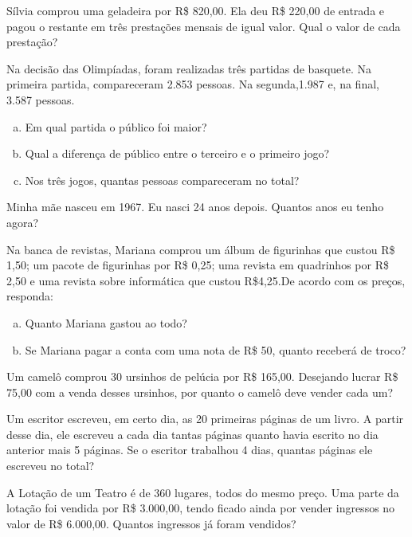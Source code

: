 	\item  Sílvia comprou uma geladeira por R\$ 820,00. Ela deu R\$ 220,00 de entrada e pagou o restante em três prestações mensais de igual valor. Qual o valor de cada prestação?

	\item Na decisão das Olimpíadas, foram realizadas três partidas de basquete. Na primeira partida, compareceram 2.853 pessoas. Na segunda,1.987 e, na final, 3.587 pessoas.
	\begin{enumerate}[a)]
		\item Em qual partida o público foi maior?
		\item Qual a diferença de público entre o terceiro e o primeiro jogo?
		\item Nos três jogos, quantas pessoas compareceram no total?
	\end{enumerate}

	\item Minha mãe nasceu em 1967. Eu nasci 24 anos depois. Quantos anos eu tenho agora?
	
	\item Na banca de revistas, Mariana comprou um álbum de figurinhas que custou R\$ 1,50; um pacote de figurinhas por R\$ 0,25; uma revista em quadrinhos por R\$ 2,50 e uma revista sobre informática que custou R\$4,25.De acordo com os preços, responda:
	\begin{enumerate}[a)]
		\item Quanto Mariana gastou ao todo?
		\item Se Mariana pagar a conta com uma nota de R\$ 50, quanto receberá de troco?
	\end{enumerate}
	
	\item Um camelô comprou 30 ursinhos de pelúcia por R\$ 165,00. Desejando lucrar R\$ 75,00 com a venda desses ursinhos, por quanto o camelô deve vender cada um?

	\item Um escritor escreveu, em certo dia, as 20 primeiras páginas de um livro. A partir desse dia, ele escreveu a cada dia tantas páginas quanto havia escrito no dia anterior mais 5 páginas. Se o escritor trabalhou 4 dias, quantas páginas ele escreveu no total?

	\item  A Lotação de um Teatro é de 360 lugares, todos do mesmo preço. Uma parte da lotação foi vendida por R\$ 3.000,00, tendo ficado ainda por vender ingressos no valor de R\$ 6.000,00. Quantos ingressos já foram vendidos?

